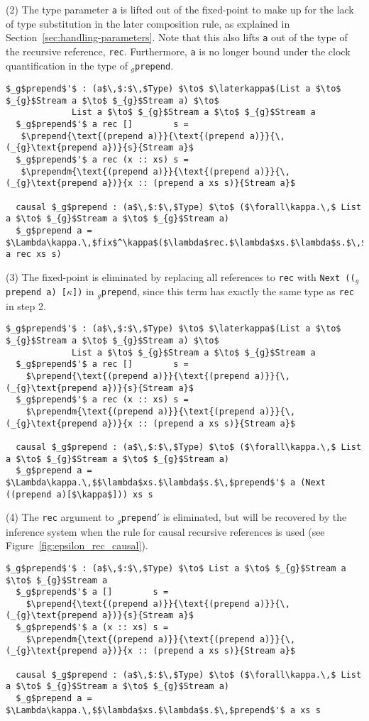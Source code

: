 (2) The type parameter \texttt{a} is lifted out of the fixed-point to make up
for the lack of type substitution in the later composition rule, as explained in
Section~\ref{sec:handling-parameters}. Note that this also lifts \texttt{a} out
of the type of the recursive reference, \texttt{rec}. Furthermore, \texttt{a} is
no longer bound under the clock quantification in the type of \texttt{$_g$prepend}.
\begin{lstlisting}[mathescape]
  $_g$prepend$'$ : (a$\,$:$\,$Type) $\to$ $\laterkappa$(List a $\to$ $_{g}$Stream a $\to$ $_{g}$Stream a) $\to$ 
             List a $\to$ $_{g}$Stream a $\to$ $_{g}$Stream a
  $_g$prepend$'$ a rec []        s =
   $\prepend{\text{(prepend a)}}{\text{(prepend a)}}{\,(_{g}\text{prepend a})}{s}{Stream a}$
  $_g$prepend$'$ a rec (x :: xs) s =
   $\prependm{\text{(prepend a)}}{\text{(prepend a)}}{\,(_{g}\text{prepend a})}{x :: (prepend a xs s)}{Stream a}$

  causal $_g$prepend : (a$\,$:$\,$Type) $\to$ ($\forall\kappa.\,$ List a $\to$ $_{g}$Stream a $\to$ $_{g}$Stream a)
  $_g$prepend a = $\Lambda\kappa.\,$fix$^\kappa$($\lambda$rec.$\lambda$xs.$\lambda$s.$\,$prepend$'$ a rec xs s)
\end{lstlisting}
(3) The fixed-point is eliminated by replacing all references to
\texttt{rec} with \texttt{Next~(($_g$prepend~a)~[$\kappa$])} in \texttt{$_g$prepend}, since this term has
exactly the same type as \texttt{rec} in step 2.
\begin{lstlisting}[mathescape]
  $_g$prepend$'$ : (a$\,$:$\,$Type) $\to$ $\laterkappa$(List a $\to$ $_{g}$Stream a $\to$ $_{g}$Stream a) $\to$ 
             List a $\to$ $_{g}$Stream a $\to$ $_{g}$Stream a
  $_g$prepend$'$ a rec []        s =
    $\prepend{\text{(prepend a)}}{\text{(prepend a)}}{\,(_{g}\text{prepend a})}{s}{Stream a}$
  $_g$prepend$'$ a rec (x :: xs) s =
    $\prependm{\text{(prepend a)}}{\text{(prepend a)}}{\,(_{g}\text{prepend a})}{x :: (prepend a xs s)}{Stream a}$

  causal $_g$prepend : (a$\,$:$\,$Type) $\to$ ($\forall\kappa.\,$ List a $\to$ $_{g}$Stream a $\to$ $_{g}$Stream a)
  $_g$prepend a = $\Lambda\kappa.\,$$\lambda$xs.$\lambda$s.$\,$prepend$'$ a (Next ((prepend a)[$\kappa$])) xs s
\end{lstlisting}
(4) The \texttt{rec} argument to \texttt{$_g$prepend$'$} is eliminated, but will
be recovered by the inference system when the rule for causal recursive
references is used (see Figure~\ref{fig:epsilon_rec_causal}).
\begin{lstlisting}[mathescape]
  $_g$prepend$'$ : (a$\,$:$\,$Type) $\to$ List a $\to$ $_{g}$Stream a $\to$ $_{g}$Stream a
  $_g$prepend$'$ a []        s =
    $\prepend{\text{(prepend a)}}{\text{(prepend a)}}{\,(_{g}\text{prepend a})}{s}{Stream a}$
  $_g$prepend$'$ a (x :: xs) s =
    $\prependm{\text{(prepend a)}}{\text{(prepend a)}}{\,(_{g}\text{prepend a})}{x :: (prepend a xs s)}{Stream a}$

  causal $_g$prepend : (a$\,$:$\,$Type) $\to$ ($\forall\kappa.\,$ List a $\to$ $_{g}$Stream a $\to$ $_{g}$Stream a)
  $_g$prepend a = $\Lambda\kappa.\,$$\lambda$xs.$\lambda$s.$\,$prepend$'$ a xs s
\end{lstlisting}
